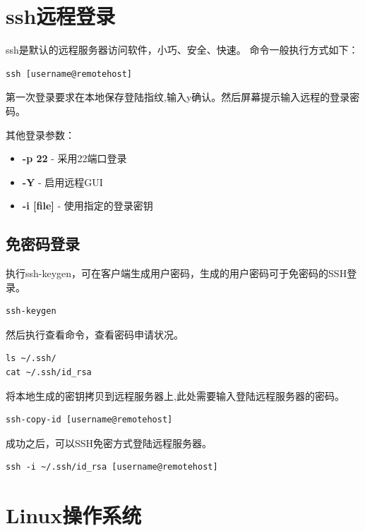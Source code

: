 \documentclass[
]{book}
\providecommand{\tightlist}{%
  \setlength{\itemsep}{0pt}\setlength{\parskip}{0pt}}
\begin{document}
\hypertarget{ssh}{%
\section{ssh远程登录}\label{ssh}}

ssh是默认的远程服务器访问软件，小巧、安全、快速。
命令一般执行方式如下：

\begin{verbatim}
ssh [username@remotehost]
\end{verbatim}

第一次登录要求在本地保存登陆指纹,输入y确认。然后屏幕提示输入远程的登录密码。

其他登录参数：

\begin{itemize}
\tightlist
\item
  \textbf{-p 22} - 采用22端口登录
\item
  \textbf{-Y} - 启用远程GUI
\item
  \textbf{-i {[}file{]}} - 使用指定的登录密钥
\end{itemize}

\hypertarget{ux514dux5bc6ux7801ux767bux5f55}{%
\subsection{免密码登录}\label{ux514dux5bc6ux7801ux767bux5f55}}

执行ssh-keygen，可在客户端生成用户密码，生成的用户密码可于免密码的SSH登录。

\begin{verbatim}
ssh-keygen
\end{verbatim}

然后执行查看命令，查看密码申请状况。

\begin{verbatim}
ls ~/.ssh/
cat ~/.ssh/id_rsa
\end{verbatim}

将本地生成的密钥拷贝到远程服务器上,此处需要输入登陆远程服务器的密码。

\begin{verbatim}
ssh-copy-id [username@remotehost]
\end{verbatim}

成功之后，可以SSH免密方式登陆远程服务器。

\begin{verbatim}
ssh -i ~/.ssh/id_rsa [username@remotehost]
\end{verbatim}

\hypertarget{linux}{%
\section{Linux操作系统}\label{linux}}
\end{document}
